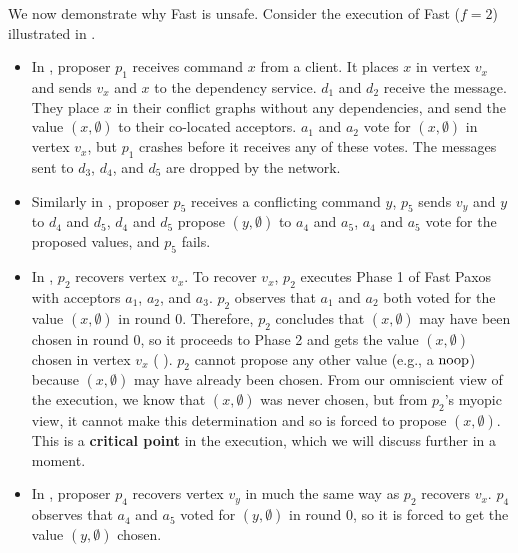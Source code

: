 We now demonstrate why Fast \BPaxos{} is unsafe. Consider the execution of Fast
\BPaxos{} ($f = 2$) illustrated in .
\begin{itemize}
  \item
    In , proposer $p_1$ receives command $x$ from a
    client. It places $x$ in vertex $v_x$ and sends $v_x$ and $x$ to the
    dependency service. $d_1$ and $d_2$ receive the message. They place $x$ in
    their conflict graphs without any dependencies, and send the value $(x,
    \emptyset{})$ to their co-located acceptors. $a_1$ and $a_2$ vote for $(x,
    \emptyset)$ in vertex $v_x$, but $p_1$ crashes before it receives any of
    these votes. The messages sent to $d_3$, $d_4$, and $d_5$ are dropped by
    the network.

 \item
    Similarly in , proposer $p_5$ receives a conflicting
    command $y$, $p_5$ sends $v_y$ and $y$ to $d_4$ and $d_5$, $d_4$ and $d_5$
    propose $(y, \emptyset{})$  to $a_4$ and $a_5$, $a_4$ and $a_5$ vote for
    the proposed values, and $p_5$ fails.

  \item
    In , $p_2$ recovers vertex $v_x$. To recover $v_x$,
    $p_2$ executes Phase 1 of Fast Paxos with acceptors $a_1$, $a_2$, and
    $a_3$. $p_2$ observes that $a_1$ and $a_2$ both voted for the value $(x,
    \emptyset{})$ in round $0$. Therefore, $p_2$ concludes that $(x,
    \emptyset{})$ may have been chosen in round $0$, so it proceeds to Phase 2
    and gets the value $(x, \emptyset)$ chosen in vertex $v_x$
    ( ). $p_2$ cannot propose any
    other value (e.g., a $\text{noop}$) because $(x, \emptyset{})$ may have already
    been chosen.  From our
    omniscient view of the execution, we know that $(x, \emptyset)$ was never
    chosen, but from $p_2$'s myopic view, it cannot make this determination and
    so is forced to propose $(x, \emptyset{})$. This is a \textbf{critical
    point} in the execution, which we will discuss further in a moment.

  \item
    In , proposer $p_4$ recovers vertex $v_y$ in much
    the same way as $p_2$ recovers $v_x$. $p_4$ observes that $a_4$ and $a_5$
    voted for $(y, \emptyset)$ in round 0, so it is forced to get the value
    $(y, \emptyset{})$ chosen.


\end{itemize}
